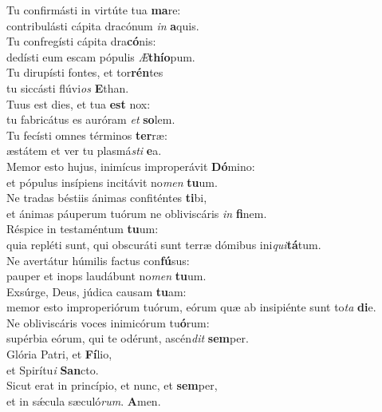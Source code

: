 \evenverse Tu confirmásti in virtúte tua \textbf{ma}re:~\*\\
\evenverse contribulásti cápita dracónum \textit{in} \textbf{a}quis.\\
\oddverse Tu confregísti cápita dra\textbf{có}nis:~\*\\
\oddverse dedísti eum escam pópulis \textit{Æ}\textbf{thí}\textbf{o}pum.\\
\evenverse Tu dirupísti fontes, et tor\textbf{rén}tes~\*\\
\evenverse tu siccásti flúvi\textit{os} \textbf{E}than.\\
\oddverse Tuus est dies, et tua \textbf{est} nox:~\*\\
\oddverse tu fabricátus es auróram \textit{et} \textbf{so}lem.\\
\evenverse Tu fecísti omnes términos \textbf{ter}ræ:~\*\\
\evenverse æstátem et ver tu plasmá\textit{sti} \textbf{e}a.\\
\oddverse Memor esto hujus, inimícus improperávit \textbf{Dó}mino:~\*\\
\oddverse et pópulus insípiens incitávit no\textit{men} \textbf{tu}um.\\
\evenverse Ne tradas béstiis ánimas confiténtes \textbf{ti}bi,~\*\\
\evenverse et ánimas páuperum tuórum ne obliviscáris \textit{in} \textbf{fi}nem.\\
\oddverse Réspice in testaméntum \textbf{tu}um:~\*\\
\oddverse quia repléti sunt, qui obscuráti sunt terræ dómibus ini\textit{qui}\textbf{tá}tum.\\
\evenverse Ne avertátur húmilis factus con\textbf{fú}sus:~\*\\
\evenverse pauper et inops laudábunt no\textit{men} \textbf{tu}um.\\
\oddverse Exsúrge, Deus, júdica causam \textbf{tu}am:~\*\\
\oddverse memor esto improperiórum tuórum, eórum quæ ab insipiénte sunt to\textit{ta} \textbf{di}e.\\
\evenverse Ne obliviscáris voces inimicórum tu\textbf{ó}rum:~\*\\
\evenverse supérbia eórum, qui te odérunt, ascén\textit{dit} \textbf{sem}per.\\
\oddverse Glória Patri, et \textbf{Fí}lio,~\*\\
\oddverse et Spirítu\textit{i} \textbf{San}cto.\\
\evenverse Sicut erat in princípio, et nunc, et \textbf{sem}per,~\*\\
\evenverse et in sǽcula sæculó\textit{rum}. \textbf{A}men.\\
